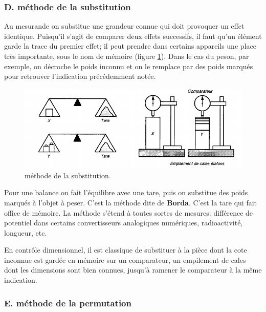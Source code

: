 \subsubsection{D. méthode de la substitution}

Au mesurande on substitue une grandeur connue qui doit provoquer un effet identique. Puisqu'il s'agit de comparer deux effets successifs, il faut qu'un élément garde la trace du premier effet; il peut prendre dans certains appareils une place très importante, sous le nom de mémoire (figure \ref{fig:metsub}). Dans le cas du peson, par exemple, on décroche le poids inconnu et on le remplace par des poids marqués pour retrouver l'indication précédemment notée.
\begin{figure}[h]
   \centering
   \includegraphics[width=15cm]{assets/figures/metsub.pdf}
   \caption{méthode de la substitution.}
   \label{fig:metsub}
\end{figure}

Pour une balance on fait l'équilibre avec une tare, puis on substitue des poids marqués à l'objet à peser. C'est la méthode dite de \textbf{Borda}. C'est la tare qui fait office de mémoire. La méthode s'étend à toutes sortes de mesures: différence de potentiel dans certains convertisseurs analogiques numériques, radioactivité, longueur, etc.

En contrôle dimensionnel, il est classique de substituer à la pièce dont la cote inconnue est gardée en mémoire sur un comparateur, un empilement de cales dont les dimensions sont bien connues, jusqu'à ramener le comparateur à la même indication.

\subsubsection{E. méthode de la permutation}

